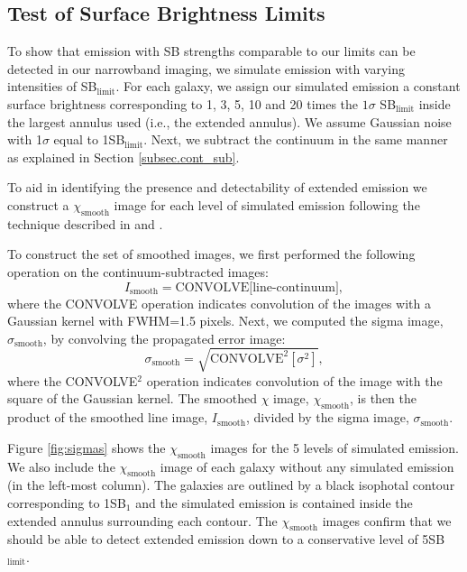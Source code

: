 \documentclass[twocolumn]{aastex62}
\begin{document}
\subsection{Test of Surface Brightness Limits}\label{subsec:test}
To show that  emission with SB strengths comparable to our limits can be detected in our narrowband imaging, we simulate emission with varying intensities of SB$_{\text{limit}}$. For each galaxy, we assign our simulated emission a constant surface brightness corresponding to 1, 3, 5, 10 and 20 times the $1\sigma$ SB$_{\text{limit}}$ inside the largest annulus used (i.e., the extended annulus). We assume Gaussian noise with 1$\sigma$ equal to 1SB$_{\text{limit}}$. Next, we subtract the continuum in the same manner as explained in Section \ref{subsec.cont_sub}. 

To aid in identifying the presence and detectability of extended  emission we construct a $\chi_{\text{smooth}}$ image for each level of simulated emission following the technique described in \cite{Hennawi2013} and \cite{Battaia_2015}.

To construct the set of smoothed images, we first performed the following operation on the continuum-subtracted images:
\begin{equation}
I_{\text{smooth}}= \text{CONVOLVE[line-continuum]},
\end{equation}
where the CONVOLVE operation indicates convolution of the  images with a Gaussian kernel with FWHM=1.5 pixels. Next, we computed the sigma image, $\sigma_{\text{smooth}}$, by convolving the propagated error image:
\begin{equation}
\sigma_{\text{smooth}}=\sqrt{\text{CONVOLVE}^2[\sigma^2]},
\end{equation}
where the CONVOLVE$^2$ operation indicates convolution of the image with the square of the Gaussian kernel. The smoothed $\chi$ image, $\chi_{\text{smooth}}$, is then the product of the smoothed line image, $I_{\text{smooth}}$, divided by the sigma image, $\sigma_{\text{smooth}}$.

Figure \ref{fig:sigmas} shows the $\chi_{\text{smooth}}$ images for the 5 levels of simulated  emission. We also include the $\chi_{\text{smooth}}$ image of each galaxy without any simulated emission (in the left-most column). The galaxies are outlined by a black isophotal contour corresponding to 1SB$_1$ and the simulated emission is contained inside the extended annulus surrounding each contour. The  $\chi_{\text{smooth}}$ images confirm that we should be able to detect extended  emission down to a conservative level of 5SB$_{\text{limit}}$. 
\end{document}
